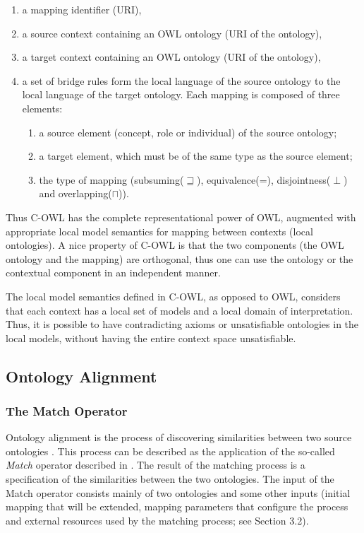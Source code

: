 \begin{enumerate}
\item a mapping identifier (URI), 
\item a source context containing an OWL ontology (URI of the ontology),

\item a target context containing an OWL ontology (URI of the ontology),

\item a set of bridge rules form the local language of the source
ontology to the local language of the target ontology. Each mapping is
composed of three elements: 

\begin{enumerate}
\item a source element (concept, role or individual) of the source
ontology; 
\item a target element, which must be of the same type as the source
element; 
\item the type of mapping (subsuming($\sqsupseteq$), equivalence(=), disjointness($\perp$) and
overlapping($\sqcap$)). 
\end{enumerate}
\end{enumerate}
Thus C-OWL has the complete representational power of OWL, augmented
with appropriate local model semantics for mapping between contexts
(local ontologies). A nice property of C-OWL is that the two components
(the OWL ontology and the mapping) are orthogonal, thus one can use the
ontology or the contextual component in an independent manner. 

The local model semantics defined in C-OWL, as opposed to OWL, considers
that each context has a local set of models and a local domain of
interpretation. Thus, it is possible to have contradicting axioms or
unsatisfiable ontologies in the local models, without having the entire
context space unsatisfiable. 

\subsection{Ontology Alignment}
\label{subsec:mediationapproaches_ontologyalignment}
\subsubsection{The Match Operator}
Ontology alignment is the process of discovering similarities between
two source ontologies \cite{debruin2005wsml}. This process can be
described as the application of the so-called \textit{Match} operator
described in \cite{rahm01survey}. The result of the matching
process is a specification of the similarities between the two
ontologies. The input of the Match operator consists mainly of two
ontologies and some other inputs (initial mapping that will be
extended, mapping parameters that configure the process and external
resources used by the matching process; see Section 3.2). 

